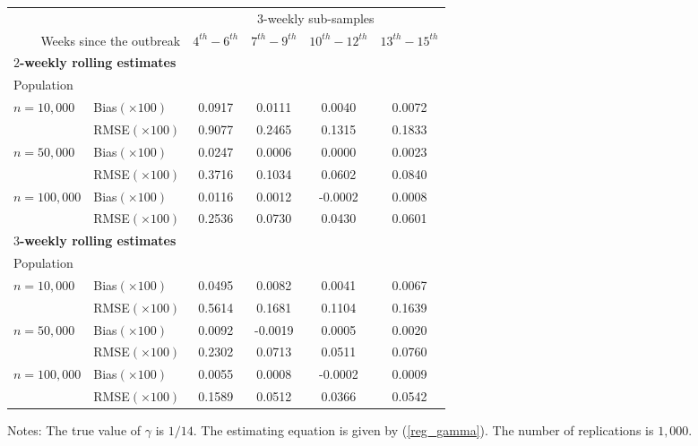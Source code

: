 \documentclass[12pt]{article}
\begin{document}
\begin{table}[tb]
\begin{center}%
\begin{tabular}
[c]{llcccc}\hline
&  & \multicolumn{4}{c}{3-weekly sub-samples}\\\cline{3-6}%
\multicolumn{2}{r}{Weeks since the outbreak} & $4^{th}-6^{th}$ &
$7^{th}-9^{th}$ & $10^{th}-12^{th}$ & $13^{th}-15^{th}$\\\hline
\multicolumn{2}{l}{$2$\textbf{-weekly rolling estimates}} &  &  &  & \\
Population &  &  &  &  & \\
$n=10,000$ & Bias$\left(  \times100\right)  $ & 0.0917 & 0.0111 & 0.0040 &
0.0072\\
& RMSE$\left(  \times100\right)  $ & 0.9077 & 0.2465 & 0.1315 & 0.1833\\
$n=50,000$ & Bias$\left(  \times100\right)  $ & 0.0247 & 0.0006 & 0.0000 &
0.0023\\
& RMSE$\left(  \times100\right)  $ & 0.3716 & 0.1034 & 0.0602 & 0.0840\\
$n=100,000$ & Bias$\left(  \times100\right)  $ & 0.0116 & 0.0012 & -0.0002 &
0.0008\\
& RMSE$\left(  \times100\right)  $ & 0.2536 & 0.0730 & 0.0430 & 0.0601\\\hline
\multicolumn{2}{l}{$3$\textbf{-weekly rolling estimates}} &
\multicolumn{1}{r}{} & \multicolumn{1}{r}{} & \multicolumn{1}{r}{} &
\multicolumn{1}{r}{}\\
Population &  & \multicolumn{1}{r}{} & \multicolumn{1}{r}{} &
\multicolumn{1}{r}{} & \multicolumn{1}{r}{}\\
$n=10,000$ & Bias$\left(  \times100\right)  $ & 0.0495 & 0.0082 & 0.0041 &
0.0067\\
& RMSE$\left(  \times100\right)  $ & 0.5614 & 0.1681 & 0.1104 & 0.1639\\
$n=50,000$ & Bias$\left(  \times100\right)  $ & 0.0092 & -0.0019 & 0.0005 &
0.0020\\
& RMSE$\left(  \times100\right)  $ & 0.2302 & 0.0713 & 0.0511 & 0.0760\\
$n=100,000$ & Bias$\left(  \times100\right)  $ & 0.0055 & 0.0008 & -0.0002 &
0.0009\\
& RMSE$\left(  \times100\right)  $ & 0.1589 & 0.0512 & 0.0366 & 0.0542\\\hline
\end{tabular}



\end{center}

%

\footnotesize\flushleft
Notes: The true value of $\gamma$ is $1/14$. The estimating equation is given
by (\ref{reg_gamma}). The number of replications is $1,000$.%

\end{table}%
\end{document}

